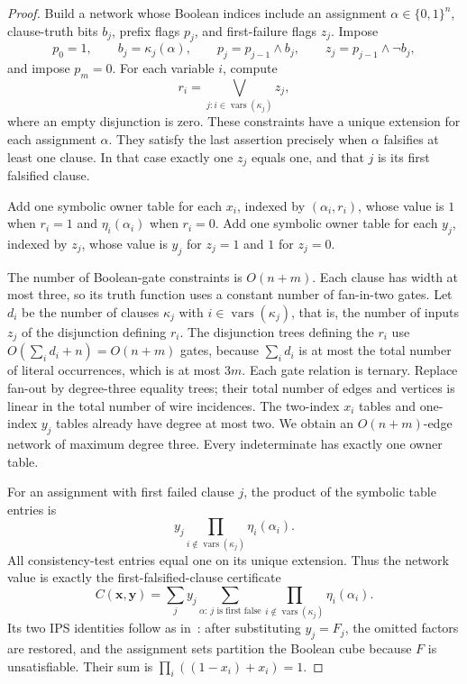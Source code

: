 \documentclass[11pt]{article}
\theoremstyle{definition}
\theoremstyle{remark}
\begin{document}
\begin{proof}
Build a network whose Boolean indices include an assignment
$\alpha\in\{0,1\}^n$, clause-truth bits $b_j$, prefix flags $p_j$,
and first-failure flags $z_j$. Impose
\[
 p_0=1,\qquad b_j=\kappa_j(\alpha),\qquad
 p_j=p_{j-1}\wedge b_j,\qquad
 z_j=p_{j-1}\wedge\neg b_j,
\]
and impose $p_m=0$. For each variable $i$, compute
\[
 r_i=\bigvee_{j:i\in\operatorname{vars}(\kappa_j)}z_j,
\]
where an empty disjunction is zero. These constraints have a unique
extension for each assignment $\alpha$. They satisfy the last assertion
precisely when $\alpha$ falsifies at least one clause. In that case
exactly one $z_j$ equals one, and that $j$ is its first falsified clause.

Add one symbolic owner table for each $x_i$, indexed by
$(\alpha_i,r_i)$, whose value is $1$ when $r_i=1$ and
$\eta_i(\alpha_i)$ when $r_i=0$. Add one symbolic owner table for
each $y_j$, indexed by $z_j$, whose value is $y_j$ for $z_j=1$ and
$1$ for $z_j=0$.

The number of Boolean-gate constraints is $O(n+m)$. Each clause has
width at most three, so its truth function uses a constant number of
fan-in-two gates. Let $d_i$ be the number of clauses $\kappa_j$ with
$i\in\operatorname{vars}(\kappa_j)$, that is, the number of inputs
$z_j$ of the disjunction defining $r_i$. The disjunction trees defining
the $r_i$ use $O(\sum_i d_i+n)=O(n+m)$ gates, because $\sum_i d_i$ is
at most the total number of literal occurrences, which is at most $3m$. Each gate relation is ternary. Replace
fan-out by degree-three equality trees; their total number of edges
and vertices is linear in the total number of wire incidences.
The two-index $x_i$ tables and one-index $y_j$ tables already have
degree at most two. We obtain an $O(n+m)$-edge network of maximum
degree three. Every indeterminate has exactly one owner table.

For an assignment with first failed clause $j$, the product of the
symbolic table entries is
\[
 y_j\prod_{i\notin\operatorname{vars}(\kappa_j)}\eta_i(\alpha_i).
\]
All consistency-test entries equal one on its unique extension.
Thus the network value is exactly the first-falsified-clause
certificate
\[
 C(\mathbf x,\mathbf y)
 =\sum_jy_j\sum_{\alpha:\,j\text{ is first false}}
      \prod_{i\notin\operatorname{vars}(\kappa_j)}\eta_i(\alpha_i).
\]
Its two IPS identities follow as in~\cite{PreviousNote}: after
substituting $y_j=F_j$, the omitted factors are restored, and the
assignment sets partition the Boolean cube because $F$ is
unsatisfiable. Their sum is
$\prod_i((1-x_i)+x_i)=1$.


\end{proof}
\end{document}
